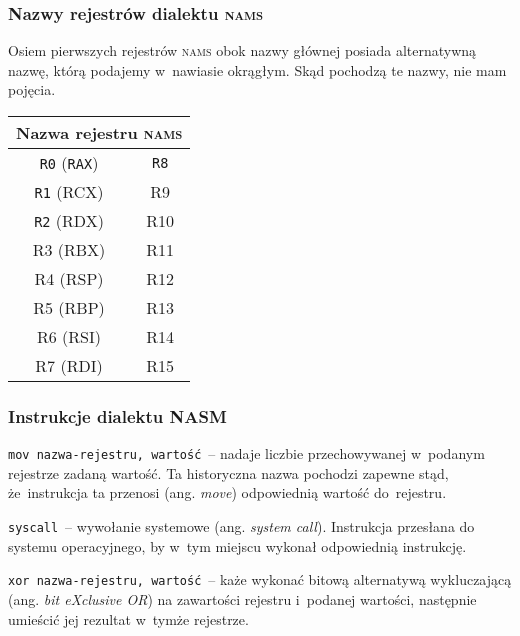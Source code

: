 \documentclass[10pt,t]{beamer}
\begin{document}
\begin{frame}
  \frametitle{Nazwy rejestrów dialektu \textsc{nams}}


  Osiem pierwszych rejestrów \textsc{nams} obok nazwy głównej posiada
  alternatywną nazwę, którą podajemy w~nawiasie okrągłym. Skąd pochodzą te
  nazwy, nie mam pojęcia.





  \begin{center}

    \begin{tabular}{|c|c|}
      \hline
      \multicolumn{2}{|c|}{Nazwa rejestru \textsc{nams}} \\
      \hline
      \texttt{R0} (\texttt{RAX}) & \texttt{R8}\hphantom{0} \\
      \texttt{R1} (RCX) & R9  \\
      \texttt{R2} (RDX) & R10 \\
      R3 (RBX) & R11 \\
      R4 (RSP) & R12 \\
      R5 (RBP) & R13 \\
      R6 (RSI) & R14 \\
      R7 (RDI) & R15 \\
      \hline
    \end{tabular}

  \end{center}

\end{frame}





\begin{frame}
  \frametitle{Instrukcje dialektu NASM}


  \texttt{mov nazwa-rejestru, wartość}~-- nadaje liczbie przechowywanej
  w~podanym rejestrze zadaną wartość. Ta historyczna nazwa pochodzi zapewne
  stąd, że~instrukcja ta przenosi (ang. \textit{move}) odpowiednią wartość
  do~rejestru.

  \texttt{syscall}~-- wywołanie systemowe (ang. \textit{system call}).
  Instrukcja przesłana do systemu operacyjnego, by w~tym miejscu wykonał
  odpowiednią instrukcję.

  \texttt{xor nazwa-rejestru, wartość}~-- każe wykonać bitową alternatywą
  wykluczającą (ang. \textit{bit eXclusive OR}) na zawartości rejestru
  i~podanej wartości, następnie umieścić jej rezultat w~tymże rejestrze.

\end{frame}
\end{document}
